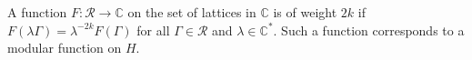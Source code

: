 A function $F: \mathcal{R} \to \mathbb{C}$ on the set of lattices in $\mathbb{C}$ is of weight $2k$ if $F(\lambda\Gamma) = \lambda^{-2k}F(\Gamma)$ for all $\Gamma \in \mathcal{R}$ and $\lambda \in \mathbb{C}^*$. Such a function corresponds to a modular function on $H$.
